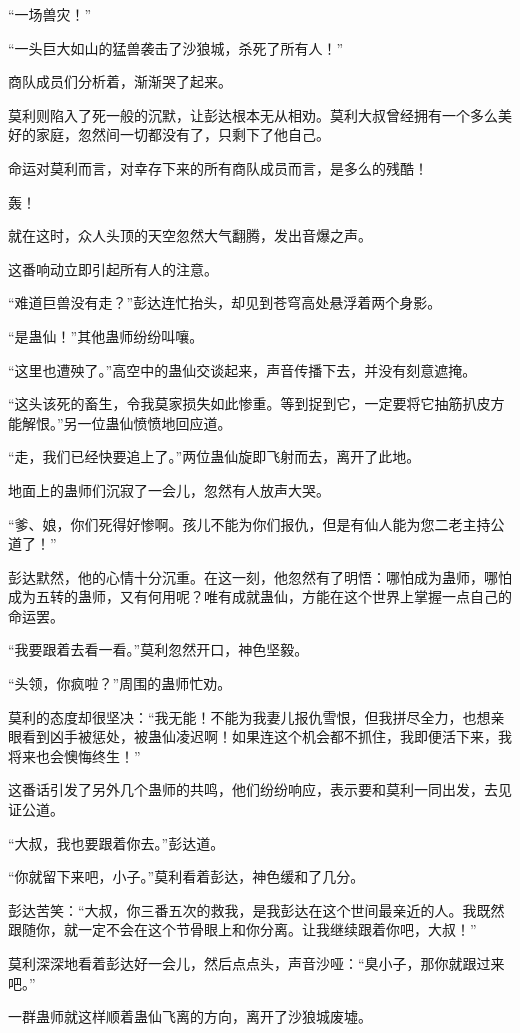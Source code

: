 \begin{this_body}
“一场兽灾！”

“一头巨大如山的猛兽袭击了沙狼城，杀死了所有人！”

商队成员们分析着，渐渐哭了起来。

莫利则陷入了死一般的沉默，让彭达根本无从相劝。莫利大叔曾经拥有一个多么美好的家庭，忽然间一切都没有了，只剩下了他自己。

命运对莫利而言，对幸存下来的所有商队成员而言，是多么的残酷！

轰！

就在这时，众人头顶的天空忽然大气翻腾，发出音爆之声。

这番响动立即引起所有人的注意。

“难道巨兽没有走？”彭达连忙抬头，却见到苍穹高处悬浮着两个身影。

“是蛊仙！”其他蛊师纷纷叫嚷。

“这里也遭殃了。”高空中的蛊仙交谈起来，声音传播下去，并没有刻意遮掩。

“这头该死的畜生，令我莫家损失如此惨重。等到捉到它，一定要将它抽筋扒皮方能解恨。”另一位蛊仙愤愤地回应道。

“走，我们已经快要追上了。”两位蛊仙旋即飞射而去，离开了此地。

地面上的蛊师们沉寂了一会儿，忽然有人放声大哭。

“爹、娘，你们死得好惨啊。孩儿不能为你们报仇，但是有仙人能为您二老主持公道了！”

彭达默然，他的心情十分沉重。在这一刻，他忽然有了明悟：哪怕成为蛊师，哪怕成为五转的蛊师，又有何用呢？唯有成就蛊仙，方能在这个世界上掌握一点自己的命运罢。

“我要跟着去看一看。”莫利忽然开口，神色坚毅。

“头领，你疯啦？”周围的蛊师忙劝。

莫利的态度却很坚决：“我无能！不能为我妻儿报仇雪恨，但我拼尽全力，也想亲眼看到凶手被惩处，被蛊仙凌迟啊！如果连这个机会都不抓住，我即便活下来，我将来也会懊悔终生！”

这番话引发了另外几个蛊师的共鸣，他们纷纷响应，表示要和莫利一同出发，去见证公道。

“大叔，我也要跟着你去。”彭达道。

“你就留下来吧，小子。”莫利看着彭达，神色缓和了几分。

彭达苦笑：“大叔，你三番五次的救我，是我彭达在这个世间最亲近的人。我既然跟随你，就一定不会在这个节骨眼上和你分离。让我继续跟着你吧，大叔！”

莫利深深地看着彭达好一会儿，然后点点头，声音沙哑：“臭小子，那你就跟过来吧。”

一群蛊师就这样顺着蛊仙飞离的方向，离开了沙狼城废墟。


\end{this_body}

